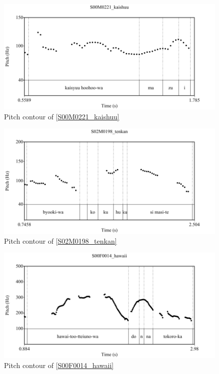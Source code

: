 %
\begin{figure}
	\begin{center}
	\includegraphics[width=.5\textwidth]{sounds/S00M0221_kaishuu.pdf}
	\caption{Pitch contour of \ref{S00M0221_kaishuu}}
	\label{S00M0221_kaishuuF}
	\end{center}
\end{figure}
\begin{figure}
	\begin{center}
	\includegraphics[width=.5\textwidth]{sounds/S02M0198_tenkan.pdf}
	\caption{Pitch contour of \ref{S02M0198_tenkan}}
	\label{S02M0198_tenkanF}
	\end{center}
\end{figure}
\begin{figure}
	\begin{center}
	\includegraphics[width=.5\textwidth]{sounds/S00F0014_hawaii.pdf}
	\caption{Pitch contour of \ref{S00F0014_hawaii}}
	\label{S00F0014_hawaiiF}
	\end{center}
\end{figure}
